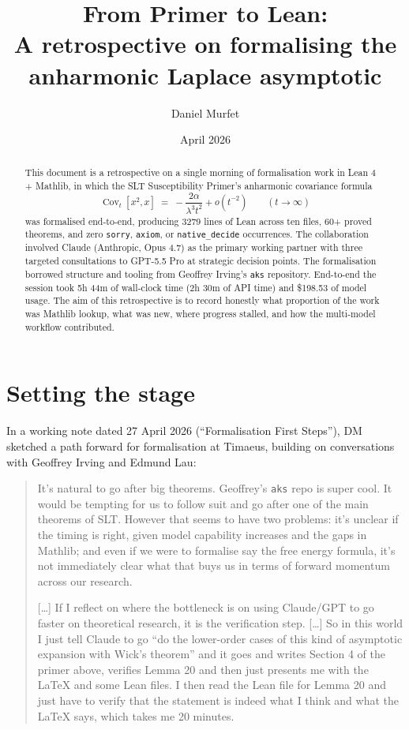 \documentclass[11pt]{article}
\title{From Primer to Lean:\\A retrospective on formalising the\\anharmonic Laplace asymptotic}
\author{Daniel Murfet}
\date{April 2026}
\begin{document}
\maketitle

\begin{abstract}
This document is a retrospective on a single morning of formalisation work
in Lean 4 + Mathlib, in which the SLT Susceptibility Primer's anharmonic
covariance formula
\[
  \operatorname{Cov}_t[x^2,x]
  \;=\; -\frac{2\alpha}{\lambda^3 t^2} + o(t^{-2}) \qquad (t\to\infty)
\]
was formalised end-to-end, producing 3279 lines of Lean across ten files,
60+ proved theorems, and zero \texttt{sorry}, \texttt{axiom},
or \texttt{native\_decide} occurrences. The collaboration involved Claude
(Anthropic, Opus 4.7) as the primary working partner with three targeted
consultations to GPT-5.5 Pro at strategic decision points. The formalisation
borrowed structure and tooling from Geoffrey Irving's
\texttt{aks} repository. End-to-end the session took 5h 44m of wall-clock
time (2h 30m of API time) and \$198.53 of model usage. The aim of this
retrospective is to record honestly what proportion of the work was Mathlib
lookup, what was new, where progress stalled, and how the multi-model
workflow contributed.
\end{abstract}

\tableofcontents

\section{Setting the stage}

In a working note dated 27 April 2026 (``Formalisation First Steps''), DM
sketched a path forward for formalisation at Timaeus, building on
conversations with Geoffrey Irving and Edmund Lau:

\begin{quote}
It's natural to go after big theorems. Geoffrey's \texttt{aks} repo is
super cool. It would be tempting for us to follow suit and go after one of
the main theorems of SLT. However that seems to have two problems: it's
unclear if the timing is right, given model capability increases and the
gaps in Mathlib; and even if we were to formalise say the free energy
formula, it's not immediately clear what that buys us in terms of forward
momentum across our research.

[\ldots] If I reflect on where the bottleneck is on using Claude/GPT to go
faster on theoretical research, it is the verification step. [\ldots] So
in this world I just tell Claude to go ``do the lower-order cases of this
kind of asymptotic expansion with Wick's theorem'' and it goes and writes
Section 4 of the primer above, verifies Lemma 20 and then just presents me
with the LaTeX and some Lean files. I then read the Lean file for Lemma 20
and just have to verify that the statement is indeed what I think and what
the LaTeX says, which takes me 20 minutes.
\end{quote}
\end{document}
